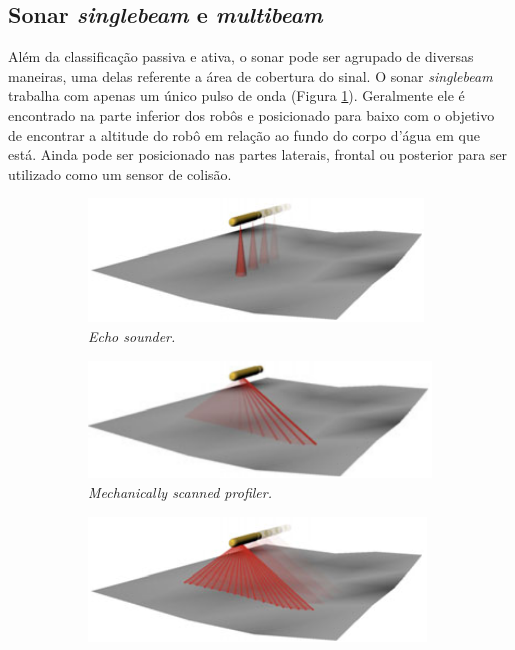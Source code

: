\subsection{Sonar \textit{singlebeam} e \textit{multibeam}}
\label{sec:single-multibeam}
Além da classificação passiva e ativa, o sonar pode ser agrupado de diversas maneiras, uma delas referente a área de cobertura do sinal.
O sonar \textit{singlebeam} trabalha com apenas um único pulso de onda (Figura \ref{fig:echo-sounder}). Geralmente ele é encontrado na parte inferior dos robôs e posicionado para baixo com o objetivo de encontrar a altitude do robô em relação ao fundo do corpo d'água em que está. Ainda pode ser posicionado nas partes laterais, frontal ou posterior para ser utilizado como um sensor de colisão.

\begin{figure}[H]
    \centering
    \begin{subfigure}[t]{0.4\textwidth}
        \includegraphics[width=\textwidth]{dados/figuras/singlebeam.png}
        \caption{\textit{Echo sounder.}}
        \label{fig:echo-sounder}
    \end{subfigure}
    \begin{subfigure}[t]{0.4\textwidth}
        \includegraphics[width=\textwidth]{dados/figuras/mec-scan-profiling.png}
        \caption{\textit{Mechanically scanned profiler.}}
        \label{fig:mec-scan-prof}
    \end{subfigure}
    \begin{subfigure}[t]{0.4\textwidth}
        \includegraphics[width=\textwidth]{dados/figuras/multibeam.png}

\end{subfigure}
\end{figure}
